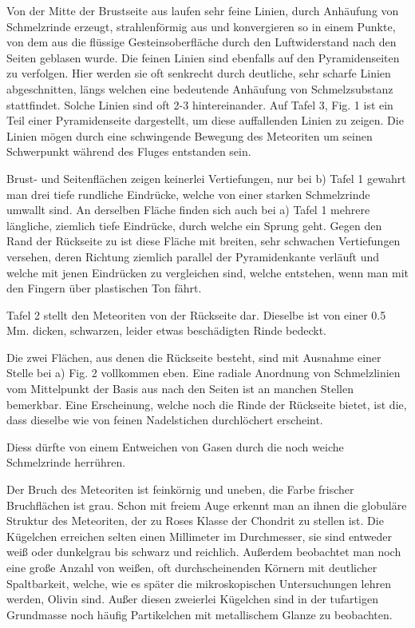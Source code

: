 \documentclass[a4paper, 11pt, oneside]{article}
\begin{document}
Von der Mitte der Brustseite aus laufen sehr feine Linien, durch Anhäufung von Schmelzrinde erzeugt, strahlenförmig aus und konvergieren so in einem Punkte, von dem aus die flüssige Gesteinsoberfläche durch den Luftwiderstand nach den Seiten geblasen wurde. Die feinen Linien sind ebenfalls auf den Pyramidenseiten zu verfolgen. Hier werden sie oft senkrecht durch deutliche, sehr scharfe Linien abgeschnitten, längs welchen eine bedeutende Anhäufung von Schmelzsubstanz stattfindet. Solche Linien sind oft 2-3 hintereinander. Auf Tafel 3, Fig. 1 ist ein Teil einer Pyramidenseite dargestellt, um diese auffallenden Linien zu zeigen. Die Linien mögen durch eine schwingende Bewegung des Meteoriten um seinen Schwerpunkt während des Fluges entstanden sein.

Brust- und Seitenflächen zeigen keinerlei Vertiefungen, nur bei b) Tafel 1 gewahrt man drei tiefe rundliche Eindrücke, welche von einer starken Schmelzrinde umwallt sind. An derselben Fläche finden sich auch bei a) Tafel 1 mehrere längliche, ziemlich tiefe Eindrücke, durch welche ein Sprung geht. Gegen den Rand der Rückseite zu ist diese Fläche mit breiten, sehr schwachen Vertiefungen versehen, deren Richtung ziemlich parallel der Pyramidenkante verläuft und welche mit jenen Eindrücken zu vergleichen sind, welche entstehen, wenn man mit den Fingern über plastischen Ton fährt.

Tafel 2 stellt den Meteoriten von der Rückseite dar. Dieselbe ist von einer 0.5 Mm. dicken, schwarzen, leider etwas beschädigten Rinde bedeckt.

Die zwei Flächen, aus denen die Rückseite besteht, sind mit Ausnahme einer Stelle bei a) Fig. 2 vollkommen eben. Eine radiale Anordnung von Schmelzlinien vom Mittelpunkt der Basis aus nach den Seiten ist an manchen Stellen bemerkbar. Eine Erscheinung, welche noch die Rinde der Rückseite bietet, ist die, dass dieselbe wie von feinen Nadelstichen durchlöchert erscheint.

Diess dürfte von einem Entweichen von Gasen durch die noch weiche Schmelzrinde herrühren.

Der Bruch des Meteoriten ist feinkörnig und uneben, die Farbe frischer Bruchflächen ist grau. Schon mit freiem Auge erkennt man an ihnen die globuläre Struktur des Meteoriten, der zu Roses Klasse der Chondrit zu stellen ist. Die Kügelchen erreichen selten einen Millimeter im Durchmesser, sie sind entweder weiß oder dunkelgrau bis schwarz und reichlich. Außerdem beobachtet man noch eine große Anzahl von weißen, oft durchscheinenden Körnern mit deutlicher Spaltbarkeit, welche, wie es später die mikroskopischen Untersuchungen lehren werden, Olivin sind. Außer diesen zweierlei Kügelchen sind in der tufartigen Grundmasse noch häufig Partikelchen mit metallischem Glanze zu beobachten.
\end{document}
